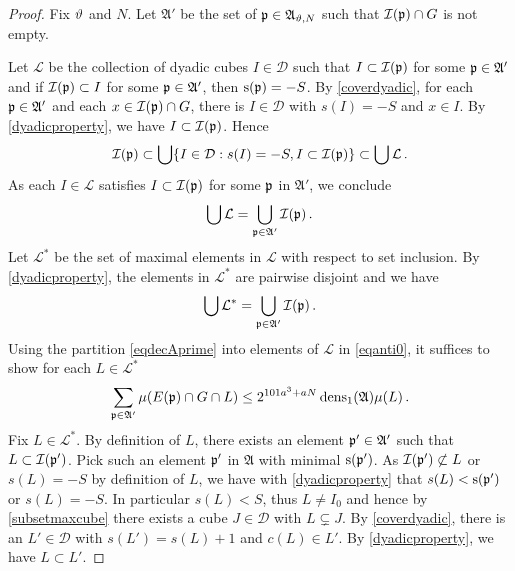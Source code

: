 \begin{proof}
{Fix ${\vartheta}$ and $N$. Let
$\mathfrak{A}'$ be the set of ${\mathfrak p}\in\mathfrak{A}_{{\vartheta},N}$ such that ${\mathcal{I}}({\mathfrak p})\cap G$ is not empty.}


   Let $\mathcal{L}$ be the collection of dyadic cubes $I\in\mathcal{D}$ such that $I\subset {\mathcal{I}}({\mathfrak p})$ for some ${\mathfrak p}\in\mathfrak{A}'$ and if ${\mathcal{I}}({\mathfrak p})\subset I$ for some ${\mathfrak p}\in\mathfrak{A}'$, then ${\mathrm{s}}({\mathfrak p})=-S$. By \eqref{coverdyadic}, for each ${\mathfrak p} \in \mathfrak{A}'$
   and each $x\in {\mathcal{I}}({\mathfrak p})\cap G$, there is $I\in \mathcal{D}$ with $s(I)=-S$ and $x\in I$. By \eqref{dyadicproperty},
   we have $I\subset {\mathcal{I}}({\mathfrak p})$. Hence
   \begin{equation}
       {\mathcal{I}}({\mathfrak p})\subset \bigcup\{I\in \mathcal{D}: s(I)=-S, I\subset {\mathcal{I}}({\mathfrak p})\}\subset \bigcup \mathcal{L}\, .
   \end{equation}
As each $I\in \mathcal{L}$ satisfies $I\subset {\mathcal{I}}({\mathfrak p})$ for some ${\mathfrak p}$ in $\mathfrak{A'}$, we conclude
     \begin{equation}
\bigcup\mathcal{L}=\bigcup_{{\mathfrak p} \in \mathfrak{A}'}{\mathcal{I}}({\mathfrak p})\, .
   \end{equation}
Let $\mathcal{L}^*$ be the set of maximal elements in $\mathcal{L}$ with respect to set inclusion.
By \eqref{dyadicproperty}, the elements in $\mathcal{L}^*$ are pairwise disjoint and we have
 \begin{equation}\label{eqdecAprime}
\bigcup\mathcal{L}^*=\bigcup_{{\mathfrak p} \in \mathfrak{A}'}{\mathcal{I}}({\mathfrak p})\, .
   \end{equation}
Using the partition \eqref{eqdecAprime} into elements of $\mathcal{L}$ in \eqref{eqanti0}, it suffices to show for each $L\in \mathcal{L}^*$
\begin{equation}\label{eqanti0}
    \sum_{{\mathfrak p}\in\mathfrak{A}'}\mu(E({\mathfrak p})\cap G \cap L)
    \le
    2^{101a^3+aN}
    \operatorname{\operatorname{dens}}_1(\mathfrak{A})\mu(L)\,.
\end{equation}
Fix $L\in \mathcal{L}^*$.
By definition of $L$, there exists an element ${\mathfrak p}'\in \mathfrak{A}'$ such that $L\subset {\mathcal{I}}({\mathfrak p}')$. Pick such an element ${\mathfrak p}
'$
in $\mathfrak{A}$ with minimal ${\mathrm{s}}({\mathfrak p}')$. As ${\mathcal{I}}({\mathfrak p}')\not \subset L$ or $s(L) = -S$ by definition of $L$, we have
with \eqref{dyadicproperty} that $s(L)< {\mathrm{s}}({\mathfrak p}')$ or $s(L) = -S$. In particular $s(L)<S$, thus $L \ne I_0$ and hence by \eqref{subsetmaxcube}
there exists a cube $J \in \mathcal{D}$ with $L \subsetneq J$.
By \eqref{coverdyadic}, there is an
$L'\in \mathcal{D}$ with $s(L')=s(L)+1$ and $c(L)\in L'$. By \eqref{dyadicproperty}, we have
$L\subset L'$.


\end{proof}
